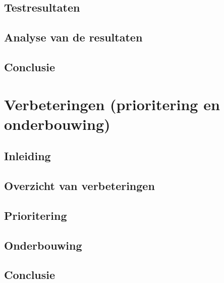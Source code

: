 \documentclass[11pt, a4paper]{report}
\begin{document}
\section{Testresultaten}

\section{Analyse van de resultaten}

\section{Conclusie}


\chapter{Verbeteringen (prioritering en onderbouwing)}

\section{Inleiding}

\section{Overzicht van verbeteringen}

\section{Prioritering}

\section{Onderbouwing}

\section{Conclusie}
\end{document}
